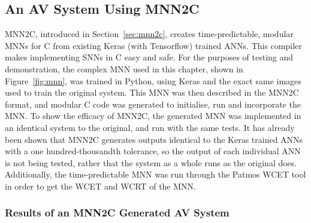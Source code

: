 \subsection{An \ac{AV} System Using \acf{MNN2C}}
\ac{MNN2C}, introduced in Section~\ref{sec:mnn2c}, creates time-predictable, modular \acfp{MNN} for C from existing Keras (with Tensorflow) trained \acp{ANN}. 
This compiler makes implementing \acfp{SNN} in C easy and safe.
For the purposes of testing and demonstration, the complex \ac{MNN} used in this chapter, shown in Figure~\ref{fig:mnn}, was trained in Python, using Keras and the exact same images used to train the original system.
This \ac{MNN} was then described in the \ac{MNN2C} format, and modular C code was generated to initialise, run and incorporate the \ac{MNN}.
To show the efficacy of \ac{MNN2C}, the generated \ac{MNN} was implemented in an identical system to the original, and run with the same tests. 
It has already been shown that \ac{MNN2C} generates outputs identical to the Keras trained \acp{ANN} with a one hundred-thousandth tolerance, so the output of each individual \ac{ANN} is not being tested, rather that the system as a whole runs as the original does.
Additionally, the time-predictable \ac{MNN} was run through the Patmos \ac{WCET} tool in order to get the \ac{WCET} and \ac{WCRT} of the \ac{MNN}.

\subsubsection{Results of an \ac{MNN2C} Generated \ac{AV} System}




















